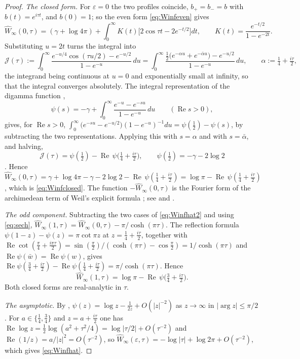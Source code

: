 \documentclass[11pt]{amsart}
\theoremstyle{definition}
\theoremstyle{remark}
\newcommand{\Rel}{\operatorname{Re}}
\newcommand{\Wh}{\widehat{W}}
\begin{document}
\begin{proof}
\emph{The closed form.}  For $\varepsilon=0$ the two profiles coincide,
$b_{+}=b_{-}=b$ with $b(t)=e^{i\tau t}$, and $b(0)=1$; so the even form
\eqref{eq:Winfeven} gives
\[
\Wh_{\infty}(0,\tau)=(\gamma+\log4\pi)+\int_0^{\infty}K(t)
\bigl[2\cos\tau t-2e^{-t/2}\bigr]dt,\qquad
K(t)=\frac{e^{-t/2}}{1-e^{-2t}} .
\]
Substituting $u=2t$ turns the integral into
\[
\mathcal J(\tau):=\int_0^{\infty}
\frac{e^{-u/4}\cos(\tau u/2)-e^{-u/2}}{1-e^{-u}}\,du
=\int_0^{\infty}\frac{\tfrac12\bigl(e^{-\alpha u}+e^{-\bar\alpha u}\bigr)
-e^{-u/2}}{1-e^{-u}}\,du,\qquad \alpha:=\tfrac14+\tfrac{i\tau}{2},
\]
the integrand being continuous at $u=0$ and exponentially small at infinity,
so that the integral converges absolutely.  The integral representation
of the digamma function \cite[(5.9.16)]{DLMF},
\[
\psi(s)=-\gamma+\int_0^{\infty}\frac{e^{-u}-e^{-su}}{1-e^{-u}}\,du
\qquad(\Rel s>0),
\]
gives, for $\Rel s>0$,
$\int_0^{\infty}\bigl(e^{-su}-e^{-u/2}\bigr)(1-e^{-u})^{-1}du
=\psi(\tfrac12)-\psi(s)$, by subtracting the two representations.  Applying
this with $s=\alpha$ and with $s=\bar\alpha$, and halving,
\[
\mathcal J(\tau)=\psi(\tfrac12)-\Rel\,\psi\bigl(\tfrac14+\tfrac{i\tau}{2}\bigr),
\qquad \psi(\tfrac12)=-\gamma-2\log2
\]
\cite[(5.4.13)]{DLMF}.  Hence $\Wh_{\infty}(0,\tau)=\gamma+\log4\pi-\gamma-2\log2-
\Rel\,\psi(\tfrac14+\tfrac{i\tau}{2})=\log\pi-
\Rel\,\psi(\tfrac14+\tfrac{i\tau}{2})$, which is \eqref{eq:Winfclosed}.
The function $-\Wh_{\infty}(0,\tau)$ is the Fourier form of the archimedean
term of Weil's explicit formula \cite{Weil1952}; see
\cite[Appendix~B]{CCWeilArch} and \cite{BurnolCR}.

\emph{The odd component.}  Subtracting the two cases of \eqref{eq:Winfhat2}
and using \eqref{eq:sech},
$\Wh_{\infty}(1,\tau)=\Wh_{\infty}(0,\tau)-\pi/\cosh(\pi\tau)$.  The reflection
formula $\psi(1-z)-\psi(z)=\pi\cot\pi z$ \cite[(5.5.4)]{DLMF} at
$z=\tfrac14+\tfrac{i\tau}2$, together with
$\Rel\cot(\tfrac\pi4+\tfrac{i\pi\tau}2)=\sin(\tfrac\pi2)/(\cosh(\pi\tau)-\cos\tfrac\pi2)
=1/\cosh(\pi\tau)$ and $\Rel\psi(\bar w)=\Rel\psi(w)$, gives
$\Rel\psi(\tfrac34+\tfrac{i\tau}2)-\Rel\psi(\tfrac14+\tfrac{i\tau}2)=\pi/\cosh(\pi\tau)$.
Hence
\begin{equation}\label{eq:Winfodd}
\Wh_{\infty}(1,\tau)=\log\pi-\Rel\,\psi\bigl(\tfrac34+\tfrac{i\tau}{2}\bigr).
\end{equation}
Both closed forms are real-analytic in $\tau$.

\emph{The asymptotic.}  By \cite[(5.11.2)]{DLMF},
$\psi(z)=\log z-\tfrac1{2z}+O(|z|^{-2})$ as $z\to\infty$ in
$|\arg z|\le\pi/2$.  For $a\in\{\tfrac14,\tfrac34\}$ and $z=a+\tfrac{i\tau}2$
one has $\Rel\log z=\tfrac12\log(a^{2}+\tau^{2}/4)=\log|\tau/2|+O(\tau^{-2})$
and $\Rel(1/z)=a/|z|^{2}=O(\tau^{-2})$, so
$\Wh_{\infty}(\varepsilon,\tau)=-\log|\tau|+\log2\pi+O(\tau^{-2})$, which
gives \eqref{eq:Winfhat}.


\end{proof}
\end{document}
